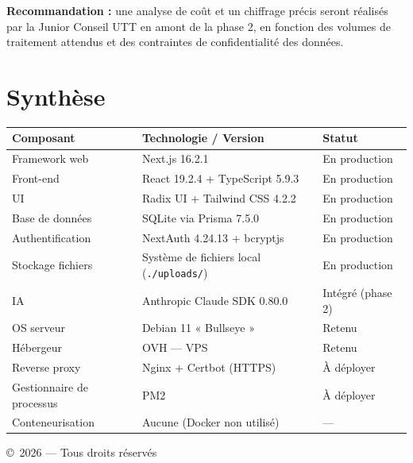 \documentclass[a4paper,12pt,french]{article}
\begin{document}
\vspace{0.5em}

\textbf{Recommandation :} une analyse de coût et un chiffrage précis seront réalisés par la Junior Conseil UTT en amont de la phase 2, en fonction des volumes de traitement attendus et des contraintes de confidentialité des données.


\section{Synthèse}

\begin{tabularx}{\textwidth}{l l X}
\toprule
\textbf{Composant} & \textbf{Technologie / Version} & \textbf{Statut} \\
\midrule
Framework web & Next.js 16.2.1 & En production \\
Front-end & React 19.2.4 + TypeScript 5.9.3 & En production \\
UI & Radix UI + Tailwind CSS 4.2.2 & En production \\
Base de données & SQLite via Prisma 7.5.0 & En production \\
Authentification & NextAuth 4.24.13 + bcryptjs & En production \\
Stockage fichiers & Système de fichiers local (\texttt{./uploads/}) & En production \\
IA & Anthropic Claude SDK 0.80.0 & Intégré (phase 2) \\
OS serveur & Debian 11 « Bullseye » & Retenu \\
Hébergeur & OVH — VPS & Retenu \\
Reverse proxy & Nginx + Certbot (HTTPS) & À déployer \\
Gestionnaire de processus & PM2 & À déployer \\
Conteneurisation & Aucune (Docker non utilisé) & — \\
\bottomrule
\end{tabularx}

\vfill
{\footnotesize\textcolor{maintext}{\copyright\ 2026 — Tous droits réservés}}
\end{document}
